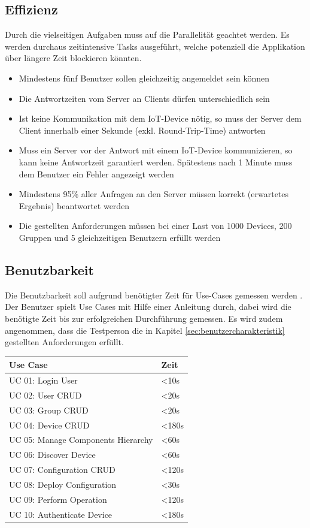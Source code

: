 \subsection{Effizienz}
Durch die vielseitigen Aufgaben muss auf die Parallelität geachtet werden. Es werden durchaus zeitintensive Tasks ausgeführt, welche potenziell die Applikation über längere Zeit blockieren könnten.

\begin{itemize}
\item Mindestens fünf Benutzer sollen gleichzeitig angemeldet sein können
\item Die Antwortzeiten vom Server an Clients dürfen unterschiedlich sein  
\item Ist keine Kommunikation mit dem IoT-Device nötig, so muss der Server dem Client innerhalb einer Sekunde (exkl. Round-Trip-Time) antworten
\item Muss ein Server vor der Antwort mit einem IoT-Device kommunizieren, so kann keine Antwortzeit garantiert werden. Spätestens nach 1 Minute muss dem Benutzer ein Fehler angezeigt werden
\item Mindestens 95\% aller Anfragen an den Server müssen korrekt (erwartetes Ergebnis) beantwortet werden
\item Die gestellten Anforderungen müssen bei einer Last von 1000 Devices, 200 Gruppen und 5 gleichzeitigen Benutzern erfüllt werden
\end{itemize}
\newpage

\subsection{Benutzbarkeit}
Die Benutzbarkeit soll aufgrund benötigter Zeit für Use-Cases gemessen werden \cite{ReinhardSteiner}. Der Benutzer spielt Use Cases mit Hilfe einer Anleitung durch, dabei wird die benötigte Zeit bis zur erfolgreichen Durchführung gemessen. Es wird zudem angenommen, dass die Testperson die in Kapitel \ref{sec:benutzercharakteristik} gestellten Anforderungen erfüllt.

\begin{center}
\begin{longtable}{| p{8cm} | p{2.5cm} |}
\hline
\textbf{Use Case} 						& \textbf{Zeit}\\ \hline
UC 01: Login User    					& <10s \\ \hline
UC 02: User CRUD			 			& <20s \\ \hline
UC 03: Group CRUD	         			& <20s \\ \hline 
UC 04: Device CRUD               		& <180s \\ \hline 
UC 05: Manage Components Hierarchy		& <60s \\ \hline 
UC 06: Discover Device     				& <60s \\ \hline
UC 07: Configuration CRUD			 	& <120s \\ \hline
UC 08: Deploy Configuration				& <30s \\ \hline
UC 09: Perform Operation			 	& <120s \\ \hline
UC 10: Authenticate Device	 			& <180s \\ \hline
\end{longtable}
\end{center}
